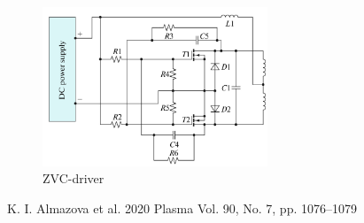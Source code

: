 	\begin{figure}[htbp]
	\centering
	\includegraphics[width=0.6\textwidth]{images/almazova_circ.png}
	\caption*{ZVC-driver}
	\label{alm_circ}
	\end{figure}

\footnotesize
\begin{thebibliography}{99}
      K. I. Almazova et al. 2020 Plasma Vol. 90, No. 7, pp. 1076–1079
\end{thebibliography}